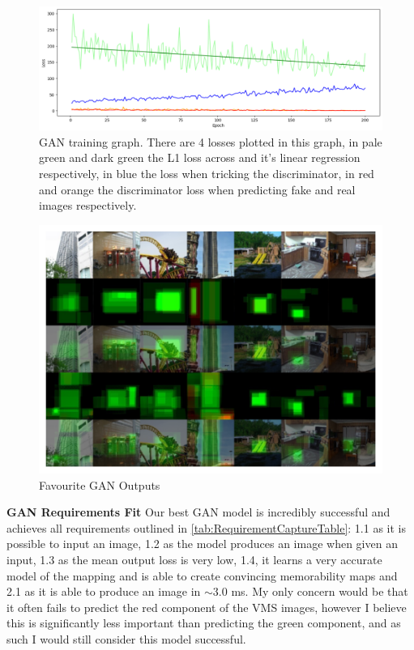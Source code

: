 \documentclass{UoYCSproject}
\begin{document}
\begin{figure}[ht]
    \centering
    \includegraphics[width=\linewidth]{GAN Training Curve}
    \caption{GAN training graph. There are 4 losses plotted in this graph, in pale green and dark green the L1 loss across and it's linear regression respectively, in blue the loss when tricking the discriminator, in red and orange the discriminator loss when predicting fake and real images respectively.}
    \label{fig:GANTraining}
\end{figure}

\begin{figure}[ht]
    \centering
    \includegraphics[width=\linewidth]{Good GAN Outputs}
    \caption{Favourite GAN Outputs}
    \label{fig:GANGoodOutput}
\end{figure}

\textbf{GAN Requirements Fit}
Our best GAN model is incredibly successful and achieves all requirements outlined in \ref{tab:RequirementCaptureTable}: 1.1 as it is possible to input an image, 1.2 as the model produces an image when given an input, 1.3 as the mean output loss is very low, 1.4, it learns a very accurate model of the mapping and is able to create convincing memorability maps and 2.1 as it is able to produce an image in \( \sim 3.0 \) ms. My only concern would be that it often fails to predict the red component of the VMS images, however I believe this is significantly less important than predicting the green component, and as such I would still consider this model successful.
\end{document}
